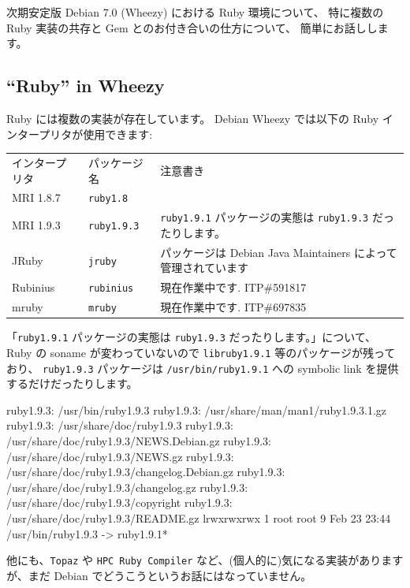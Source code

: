 \documentclass[mingoth,a4paper]{jsarticle}
\begin{document}
\vspace{1em}

次期安定版 Debian 7.0 (Wheezy) における Ruby 環境について、%
特に複数の Ruby 実装の共存と Gem とのお付き合いの仕方について、
簡単にお話しします。

\subsection{``Ruby'' in Wheezy}

Ruby には複数の実装が存在しています。
Debian Wheezy では以下の Ruby インタープリタが使用できます:
\begin{table}[h!]
  \centering
  \begin{tabular}{lll}
    インタープリタ & パッケージ名       & 注意書き \\
    MRI 1.8.7      & \texttt{ruby1.8}   &          \\
    MRI 1.9.3      & \texttt{ruby1.9.3} & \texttt{ruby1.9.1} パッケージの実態は \texttt{ruby1.9.3} だったりします。 \\
    JRuby          & \texttt{jruby}     & パッケージは Debian Java Maintainers によって管理されています \\
    Rubinius       & \texttt{rubinius}  & 現在作業中です. ITP\#591817 \\
    mruby          & \texttt{mruby}     & 現在作業中です. ITP\#697835 \\
  \end{tabular}
\end{table}
%
\newline
「\texttt{ruby1.9.1} パッケージの実態は \texttt{ruby1.9.3} だったりします。」について、
Ruby の soname が変わっていないので \texttt{libruby1.9.1} 等のパッケージが残っており、
\texttt{ruby1.9.3} パッケージは \texttt{/usr/bin/ruby1.9.1} への
symbolic link を提供するだけだったりします。
\begin{commandline}
ruby1.9.3: /usr/bin/ruby1.9.3
ruby1.9.3: /usr/share/man/man1/ruby1.9.3.1.gz
ruby1.9.3: /usr/share/doc/ruby1.9.3
ruby1.9.3: /usr/share/doc/ruby1.9.3/NEWS.Debian.gz
ruby1.9.3: /usr/share/doc/ruby1.9.3/NEWS.gz
ruby1.9.3: /usr/share/doc/ruby1.9.3/changelog.Debian.gz
ruby1.9.3: /usr/share/doc/ruby1.9.3/changelog.gz
ruby1.9.3: /usr/share/doc/ruby1.9.3/copyright
ruby1.9.3: /usr/share/doc/ruby1.9.3/README.gz
lrwxrwxrwx 1 root root 9 Feb 23 23:44 /usr/bin/ruby1.9.3 -> ruby1.9.1*
\end{commandline}
他にも、\texttt{Topaz} や \texttt{HPC Ruby Compiler} など、(個人的に)気になる実装がありますが、まだ Debian でどうこうというお話にはなっていません。
\end{document}
